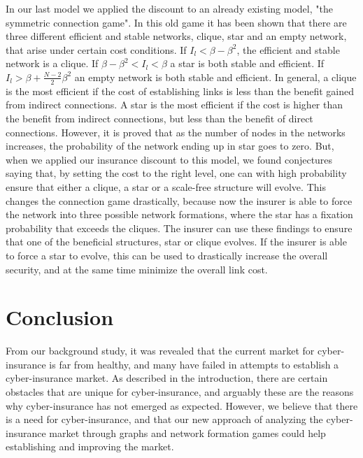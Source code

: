 In our last model we applied the discount to an already existing model, "the symmetric connection game". In this old game it has been shown that there are three different efficient and stable networks, clique, star and an empty network, that arise under certain cost conditions. If $I_{l}<\beta-\beta^{2}$, the efficient and stable network is a clique. If $\beta-\beta^{2}<I_{l}<\beta$ a star is both stable and efficient. If $I_{l}>\beta+\frac{N-2}{2}\beta^{2}$ an empty network is both stable and efficient. In general, a clique is the most efficient if the cost of establishing links is less than the benefit gained from indirect connections. A star is the most efficient if the cost is higher than the benefit from indirect connections, but less than the benefit of direct connections. 
However, it is proved that as the number of nodes in the networks increases, the probability of the network ending up in star goes to zero. But, when we applied our insurance discount to this model, we found conjectures saying that, by setting the cost to the right level, one can with high probability ensure that either a clique, a star or a scale-free structure will evolve. This changes the connection game drastically, because now the insurer is able to force the network into three possible network formations, where the star has a fixation probability that exceeds the cliques. The insurer can use these findings to ensure that one of the beneficial structures, star or clique evolves. If the insurer is able to force a star to evolve, this can be used to drastically increase the overall security, and at the same time minimize the overall link cost. 

\section{Conclusion}
From our background study, it was revealed that the current market for cyber-insurance is far from healthy, and many have failed in attempts to establish a cyber-insurance market.
As described in the introduction, there are certain obstacles that are unique for cyber-insurance, and arguably these are the reasons why cyber-insurance has not emerged as expected. 
 However, we believe that there is a need for cyber-insurance, and that our new approach of analyzing the cyber-insurance market through graphs and network formation games could help establishing and improving the market.

